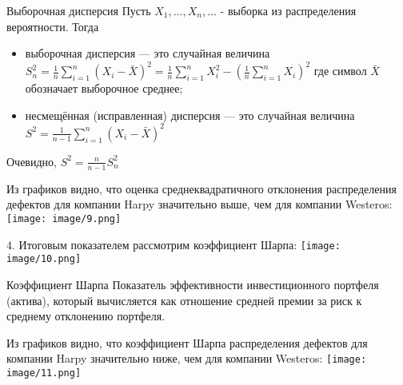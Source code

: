 ﻿\documentclass{beamer}
\begin{document}
\begin{frame}
\begin{flushleft}
\begin{block}{Выборочная дисперсия}
\tiny{Пусть}
\begin{math}
X_1,\ldots,X_n,\ldots
\end{math}
\tiny{ - выборка из распределения вероятности. Тогда}
\begin{itemize}
\item{
\tiny{выборочная дисперсия — это случайная величина }
\begin{math}
S^2_n=\frac{1}{n}\sum\limits_{i=1}^n\left(X_i-\bar{X}\right)^2=\frac{1}{n}\sum\limits_{i=1}^nX_i^2-\left(\frac{1}{n}\sum\limits_{i=1}^nX_i\right)^2
\end{math}
\tiny{где символ }
\begin{math}
\bar{X}
\end{math}
\tiny{обозначает выборочное среднее;}
}
\item{
\tiny{несмещённая (исправленная) дисперсия — это случайная величина}
\begin{math}
S^2 = \frac{1}{n-1} \sum\limits_{i=1}^n \left(X_i - \bar{X} \right)^2
\end{math}
}
\end{itemize}
\tiny{Очевидно, }
\begin{math}
S^2 = \frac{n}{n-1} S^2_n
\end{math}
\end{block}
\tiny{Из графиков видно, что оценка среднеквадратичного отклонения распределения дефектов для компании Harpy значительно выше, чем для компании Westeros:}
\texttt{[image: image/9.png]}
\end{flushleft}
\end{frame}

\begin{frame}
\begin{flushleft}
\footnotesize{4. Итоговым показателем рассмотрим коэффициент Шарпа:}
\texttt{[image: image/10.png]}
\end{flushleft}
\end{frame}

\begin{frame}
\begin{flushleft}
\begin{block}{Коэффициент Шарпа}
\tiny{Показатель эффективности инвестиционного портфеля (актива), который вычисляется как отношение средней премии за риск к среднему отклонению портфеля.}
\end{block}
\tiny{Из графиков видно, что коэффициент Шарпа распределения дефектов для компании Harpy значительно ниже, чем для компании Westeros:}
\texttt{[image: image/11.png]}
\end{flushleft}
\end{frame}
\end{document}
